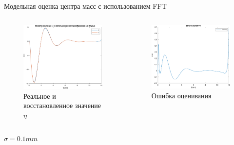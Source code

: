\documentclass[10pt]{beamer}
\begin{document}
\begin{frame}{Модельная оценка центра масс с использованием FFT}
	\begin{columns}
		\begin{figure}[h!]
			\includegraphics[width=1\linewidth]{images/eta_after_FFT.png}
			\caption{Реальное и восстановленное значение $\eta$}
		\end{figure}
		\begin{figure}[h!]
			\includegraphics[width=1\linewidth]{images/error_after_fft.png}
			\caption{Ошибка оценивания}
		\end{figure}
	\end{columns}
	$\sigma=0.1mm$
\end{frame}
\end{document}
